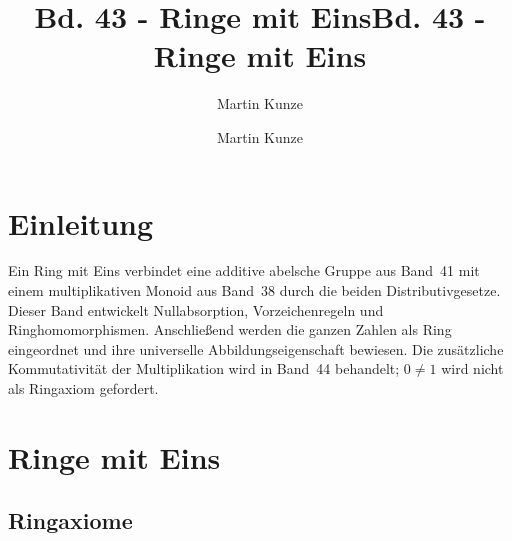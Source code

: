 \documentclass[main.tex]{subfiles}
\title{Bd. 43 - Ringe mit Eins}
\author{Martin Kunze}
\date{}
\begin{document}
\providecommand{\BandXXIXProofRefStack}[1]{%
  \ensuremath{\begin{gathered}[t]#1\end{gathered}}}
\title{Bd. 43 - Ringe mit Eins}
\author{Martin Kunze}
\date{}
\hypersetup{pageanchor=false}
\maketitle
\hypersetup{pageanchor=true}
\setcounter{tocdepth}{3}
\tableofcontents
\setcounter{file}{43}
\renewcommand{\FormulaBandID}{43}

\chapter{Einleitung}

Ein Ring mit Eins verbindet eine additive abelsche Gruppe aus Band~41
mit einem multiplikativen Monoid aus Band~38 durch die beiden
Distributivgesetze. Dieser Band entwickelt Nullabsorption,
Vorzeichenregeln und Ringhomomorphismen. Anschließend werden die ganzen
Zahlen als Ring eingeordnet und ihre universelle Abbildungseigenschaft
bewiesen. Die zusätzliche Kommutativität der Multiplikation wird in
Band~44 behandelt; \(0\neq1\) wird nicht als Ringaxiom gefordert.

\chapter{Ringe mit Eins}

\section{Ringaxiome}


\end{document}
